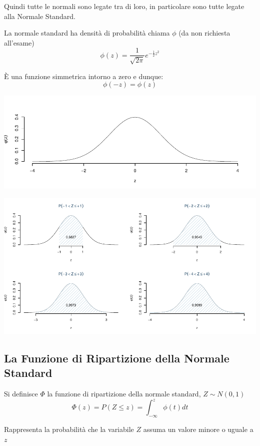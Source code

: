 \documentclass[
  11pt,
]{book}
\theoremstyle{mytheoremstyle}
\theoremstyle{mydefstyle}
\begin{document}
Quindi tutte le normali sono legate tra di loro, in particolare sono tutte legate alla Normale Standard.

La normale standard ha densità di probabilità chiama \(\phi\) (da non richiesta all'esame)
\[
\phi(z)=\frac 1 {\sqrt{2\pi}}e^{-\frac 1 2 z^2}
\]

È una funzione simmetrica intorno a zero e dunque:
\[\phi(-z)=\phi(z)\]

\begin{center}\includegraphics{Appunti_di_Statistica_2025_files/figure-latex/07c-Normale-5,-1} \end{center}

\begin{center}\includegraphics{Appunti_di_Statistica_2025_files/figure-latex/07c-Normale-6,-1} \end{center}

\subsection{La Funzione di Ripartizione della Normale Standard}\label{la-funzione-di-ripartizione-della-normale-standard}

Si definisce \(\Phi\) la funzione di ripartizione della normale standard, \(Z\sim N(0,1)\)
\[\Phi(z)=P(Z\leq z)=\int_{-\infty}^z\phi(t)dt\]

Rappresenta la probabilità che la variabile \(Z\) assuma un valore minore o uguale a \(z\)
\end{document}
